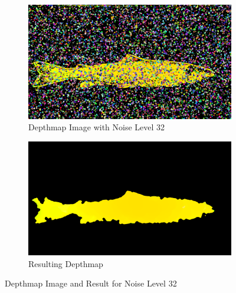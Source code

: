 \begin{figure}[H]
    \centering
    \begin{subfigure}{0.5\textwidth}
        \centering
        \includegraphics[width=.95\linewidth]{images/results/noise/noise63_32}
        \caption{Depthmap Image with Noise Level 32} 
        \label{fig:image_noise_level_32}
    \end{subfigure}%
    \begin{subfigure}{0.5\textwidth}
        \centering
        \includegraphics[width=.95\linewidth]{images/results/noise/filternoise63_32}
        \caption{Resulting Depthmap} 
        \label{fig:filter_noise_level_32}
    \end{subfigure}
    \caption{Depthmap Image and Result for Noise Level 32}
    \label{fig:noise_level_32}
\end{figure}


